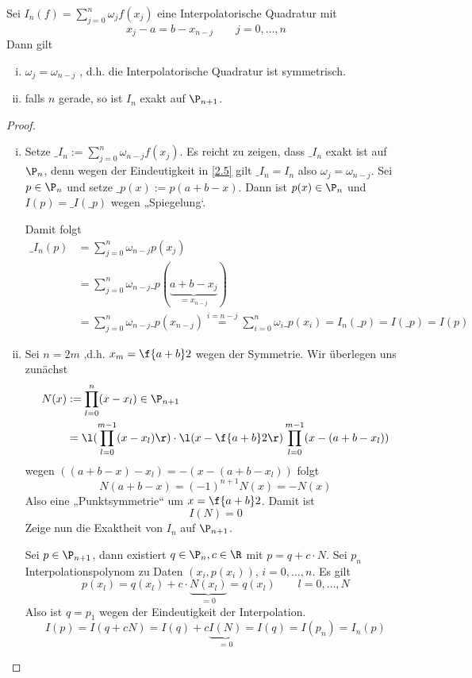 \documentclass[11pt]{scrbook}
\begin{document}
\begin{st}
	\label{2.6}
	Sei $I_n(f) = \sum_{j=0}^n \omega_j f(x_j)$ eine Interpolatorische Quadratur mit
	\[
		x_j - a = b - x_{n-j} \qquad j=0,\dotsc,n
	\]
	Dann gilt
	\begin{enumerate}[i)]
		\item
			$\omega_j = \omega_{n-j}$ , d.h. die Interpolatorische Quadratur ist symmetrisch.
		\item
			falls $n$ gerade, so ist $I_n$ exakt auf $\P_{n+1}$.
	\end{enumerate}
	\begin{proof}
		\begin{enumerate}[i)]
			\item
				Setze $\_{I_n} := \sum_{j=0}^n \omega_{n-j}f(x_j)$.
				Es reicht zu zeigen, dass $\_{I_n}$ exakt ist auf $\P_n$, denn wegen der Eindeutigkeit in \ref{2.5} gilt $\_{I_n}=I_n$ also $\omega_j=\omega_{n-j}$.
				Sei $p\in \P_n$ und setze $\_p(x) := p(a+b-x)$.
				Dann ist $p(x) \in \P_n$ und $I(p) = \_I(\_p)$ wegen „Spiegelung‘.

				Damit folgt
				\begin{align*}
					\_I_n (p) &= \sum_{j=0}^n \omega_{n-j}p(x_j) \\
					&=\sum_{j=0}^n \omega_{n-j} \_p(\underbrace{a+b-x_j}_{=x_{n-j}}) \\
					&=\sum_{j=0}^n \omega_{n-j}\_p(x_{n-j})
					\stackrel{i=n-j} = \sum_{i=0}^n \omega_i \_p(x_i)
					= I_n (\_p) = I(\_p) = I(p)
				\end{align*}
			\item
				Sei $n=2m$ ,d.h. $x_m = \f {a+b}2$ wegen der Symmetrie.
				Wir überlegen uns zunächst
				\begin{align*}
					N(x) &:= \prod_{l=0}^n (x-x_l) \in \P_{n+1} \\
					&= \l( \prod_{l=0}^{m-1}(x-x_l)\r) \cdot \l(x-\f {a+b}2\r) \prod_{l=0}^{m-1}(x-(a+b-x_l))
				\end{align*}
				wegen $((a+b-x)-x_l) = -(x-(a+b-x_l))$ folgt
				\[
					N(a+b-x) = (-1)^{n+1}N(x) = - N(x)
				\]
				Also eine „Punktsymmetrie“ um $x = \f {a+b}2$.
				Damit ist
				\[
					I(N) = 0
				\]
				Zeige nun die Exaktheit von $I_n$ auf $\P_{n+1}$.

				Sei $p\in \P_{n+1}$, dann existiert $q\in \P_n, c\in \R$ mit $p=q+c\cdot N$.
				Sei $p_n$ Interpolationspolynom zu Daten $(x_i,p(x_i))$, $i=0,\dotsc,n$.
				Es gilt
				\[
					p(x_l) = q(x_l) + c\cdot \underbrace{N(x_l)}_{=0} = q(x_l) \qquad l=0,\dotsc,N
				\]
				Also ist $q=p_1$ wegen der Eindeutigkeit der Interpolation.
				\[
					I(p) = I(q+cN) = I(q) + c\underbrace{I(N)}_{=0} = I(q) = I(p_n) = I_n(p)
				\]
		\end{enumerate}
	\end{proof}
\end{st}
\end{document}

